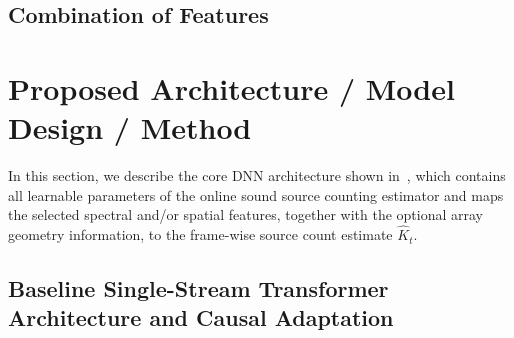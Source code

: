 \documentclass[lettersize,journal]{IEEEtran}
\begin{document}
\subsection{Combination of Features} %


\section{Proposed Architecture / Model Design / Method}
\label{sec:proposed_architecture}
In this section, we describe the core \gls{DNN} architecture shown in~, which contains all learnable parameters of the online sound source counting estimator and maps the selected spectral and/or spatial features, together with the optional array geometry information, to the frame-wise source count estimate $\widehat{K}_t$.

\subsection{Baseline Single-Stream Transformer Architecture and Causal Adaptation}
\label{sec:causal_transformer_base}
\end{document}
